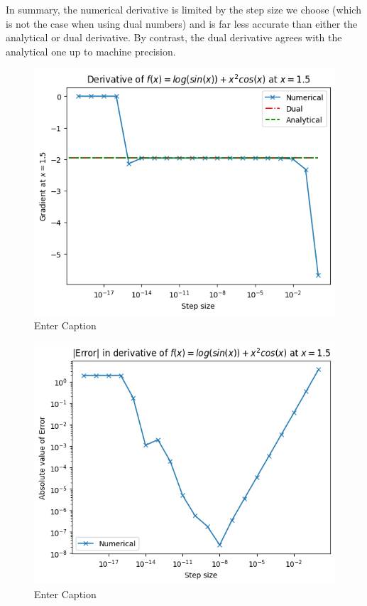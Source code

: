 \documentclass{article}
\begin{document}
In summary, the numerical derivative is limited by the step size we choose (which is not the case when using dual numbers) and is far less accurate than either the analytical or dual derivative. By contrast, the dual derivative agrees with the analytical one up to machine precision. 

\begin{figure}
    \centering
    \includegraphics[width=1\linewidth]{q5_derivative.png}
    \caption{Enter Caption}
    \label{fig:q5_derivative}
\end{figure}

\begin{figure}
    \centering
    \includegraphics[width=1\linewidth]{q5_error.png}
    \caption{Enter Caption}
    \label{fig:q5_error}
\end{figure}
\end{document}
